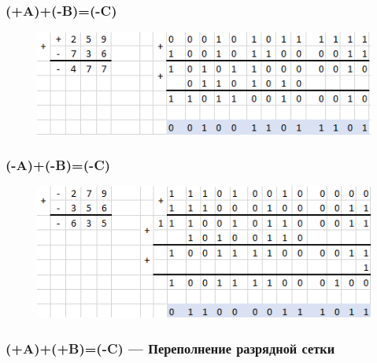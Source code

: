\documentclass[a4paper,14pt]{article}
\begin{document}
\subsubsection{(+A)+(-B)=(-C)}


\begin{figure}[H]
	\centering
	\includegraphics[width=0.7\linewidth]{primeri/screenshot003}
	\caption{}
	\label{fig:screenshot003}
\end{figure}

\subsubsection{(-A)+(-B)=(-C)}


\begin{figure}[H]
	\centering
	\includegraphics[width=0.7\linewidth]{primeri/screenshot004}
	\caption{}
	\label{fig:screenshot004}
\end{figure}

\subsubsection{(+A)+(+B)=(-C) — Переполнение разрядной сетки}

\end{document}
